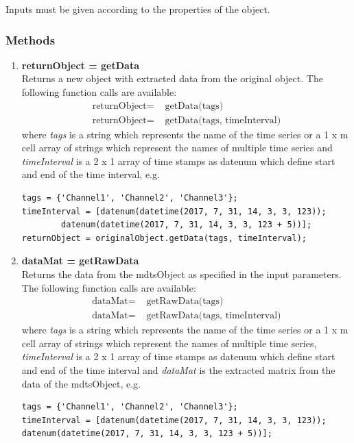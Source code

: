 \documentclass[a4]{scrreprt}
\begin{document}
Inputs must be given according to the properties of the object.

\subsubsection{Methods}

\begin{enumerate}
\item \textbf{returnObject = getData}\\
	Returns a new object with extracted data from the original object. The following function calls are available:	
	\begin{align*}
		\text{returnObject} =& \text{ getData(tags)}\\
		\text{returnObject} =& \text{ getData(tags, timeInterval)}
	\end{align*}	
	where \textit{tags} is a string which represents the name of the time series or a 1 x m cell array of strings which represent the names of multiple time series and \textit{timeInterval} is a 2 x 1 array of time stamps as datenum which define start and end of the time interval, e.g.
	\begin{lstlisting}[frame=single]
tags = {'Channel1', 'Channel2', 'Channel3'};
timeInterval = [datenum(datetime(2017, 7, 31, 14, 3, 3, 123));
		datenum(datetime(2017, 7, 31, 14, 3, 3, 123 + 5))];
returnObject = originalObject.getData(tags, timeInterval);
	\end{lstlisting}
\item \textbf{dataMat = getRawData}\\
	Returns the data from the mdtsObject as specified in the input parameters. The following function calls are available:
	\begin{align*}
	\text{dataMat} =& \text{ getRawData(tags)}\\
	\text{dataMat} =& \text{ getRawData(tags, timeInterval)}
	\end{align*}	
	where \textit{tags} is a string which represents the name of the time series or a 1 x m cell array of strings which represent the names of multiple time series, \textit{timeInterval} is a 2 x 1 array of time stamps as datenum which define start and end of the time interval and \textit{dataMat} is the extracted matrix from the data of the mdtsObject, e.g.
	\begin{lstlisting}[frame=single]
tags = {'Channel1', 'Channel2', 'Channel3'};
timeInterval = [datenum(datetime(2017, 7, 31, 14, 3, 3, 123));
datenum(datetime(2017, 7, 31, 14, 3, 3, 123 + 5))];

\end{lstlisting}
\end{enumerate}
\end{document}
